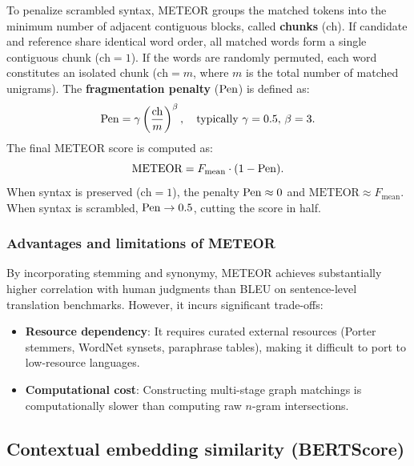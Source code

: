 \documentclass[../../main.tex]{subfiles}
\begin{document}
To penalize scrambled syntax, METEOR groups the matched tokens into the minimum number of adjacent contiguous blocks, called \textbf{chunks} ($\text{ch}$). If candidate and reference share identical word order, all matched words form a single contiguous chunk ($\text{ch} = 1$). If the words are randomly permuted, each word constitutes an isolated chunk ($\text{ch} = m$, where $m$ is the total number of matched unigrams). The \textbf{fragmentation penalty} ($\mathrm{Pen}$) is defined as:
\begin{equation}
\label{eq:meteor_penalty}
\mathrm{Pen} = \gamma \left( \frac{\text{ch}}{m} \right)^\beta, \quad \text{typically } \gamma = 0.5, \, \beta = 3.
\end{equation}
The final METEOR score is computed as:
\begin{equation}
\label{eq:meteor_final}
\text{METEOR} = F_{\text{mean}} \cdot (1 - \mathrm{Pen}).
\end{equation}
When syntax is preserved ($\text{ch} = 1$), the penalty $\mathrm{Pen} \approx 0$ and $\text{METEOR} \approx F_{\text{mean}}$. When syntax is scrambled, $\mathrm{Pen} \to 0.5$, cutting the score in half.

\subsubsection{Advantages and limitations of METEOR}
By incorporating stemming and synonymy, METEOR achieves substantially higher correlation with human judgments than BLEU on sentence-level translation benchmarks. However, it incurs significant trade-offs:
\begin{itemize}
    \item \textbf{Resource dependency}: It requires curated external resources (Porter stemmers, WordNet synsets, paraphrase tables), making it difficult to port to low-resource languages.
    \item \textbf{Computational cost}: Constructing multi-stage graph matchings is computationally slower than computing raw $n$-gram intersections.
\end{itemize}

\subsection{Contextual embedding similarity (BERTScore)}
\label{subsec:bertscore}
\end{document}
